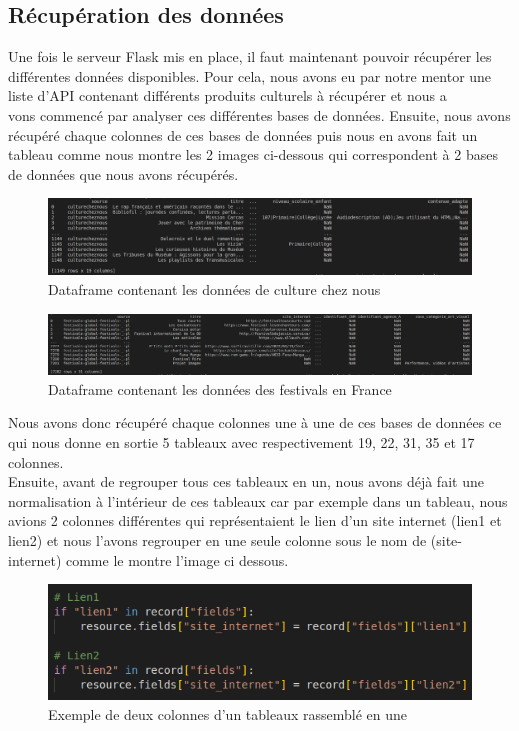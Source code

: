 \documentclass{article}
\begin{document}
\subsection{Récupération des données}
Une fois le serveur Flask mis en place, il faut maintenant pouvoir récupérer les différentes données disponibles. Pour cela, nous avons eu par notre mentor une liste d’API contenant différents produits culturels à récupérer et nous a\\vons commencé par analyser ces différentes bases de données.
Ensuite, nous avons récupéré chaque colonnes de ces bases de données puis nous en avons fait un tableau comme nous montre les 2 images ci-dessous qui correspondent à 2 bases de données que nous avons récupérés.
\begin{figure}[H]
\hspace{-25mm}
\includegraphics[scale = 0.44]{images/culturecheznous.png}
\caption{Dataframe contenant les données de culture chez nous}
\end{figure}
\begin{figure}[H]
\hspace{-25mm}
\includegraphics[scale = 0.354]{images/festivals.png}
\caption{Dataframe contenant les données des festivals en France}
\end{figure}
Nous avons donc récupéré chaque colonnes une à une de ces bases de données ce qui nous donne en sortie 5 tableaux avec respectivement 19, 22, 31, 35 et 17  colonnes.\\
Ensuite, avant de regrouper tous ces tableaux en un, nous avons déjà fait une normalisation à l’intérieur de ces tableaux car par exemple dans un tableau, nous avions 2 colonnes différentes qui représentaient le lien d’un site internet (lien1 et lien2) et nous l’avons regrouper en une seule colonne sous le nom de (site-internet) comme le montre l’image ci dessous.

\begin{figure}[H]
\center
\includegraphics[scale = 0.6]{images/liens.png}
\caption{Exemple de deux colonnes d’un tableaux rassemblé en une}
\end{figure}
\end{document}
